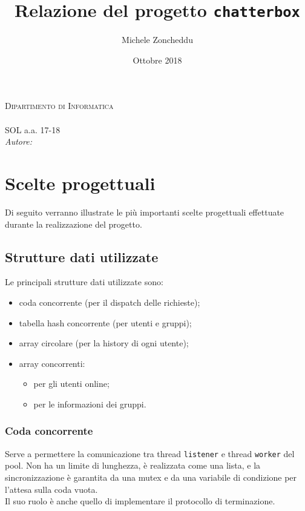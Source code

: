 \documentclass{article}
\title{Relazione del progetto \texttt{chatterbox}}
\author{Michele Zoncheddu}
\date{Ottobre 2018}
\begin{document}
\begin{titlepage}
	\centering
	\textsc{\LARGE Dipartimento di Informatica}\\[3.5 cm]
	{\huge{\@title}}\\[0.5 cm]
	{\LARGE{SOL a.a. 17-18}}\\[5.5 cm]
	\emph{Autore:}\\

	\@date
\end{titlepage}

\tableofcontents
{}
\pagebreak

\sloppy
\section{Scelte progettuali}
Di seguito verranno illustrate le più importanti scelte progettuali effettuate durante la realizzazione del progetto.
 
\subsection{Strutture dati utilizzate}
Le principali strutture dati utilizzate sono:
\begin{itemize}
	\item coda concorrente (per il dispatch delle richieste);
	\item tabella hash concorrente (per utenti e gruppi);
	\item array circolare (per la history di ogni utente);
	\item array concorrenti:
	\begin{itemize}
		\item per gli utenti online;
		\item per le informazioni dei gruppi.
	\end{itemize}
\end{itemize}

\subsubsection{Coda concorrente}
Serve a permettere la comunicazione tra thread \texttt{listener} e thread \texttt{worker} del pool. Non ha un limite di lunghezza, è realizzata come una lista, e la sincronizzazione è garantita da una mutex e da una variabile di condizione per l'attesa sulla coda vuota.\\
Il suo ruolo è anche quello di implementare il protocollo di terminazione.
\end{document}
